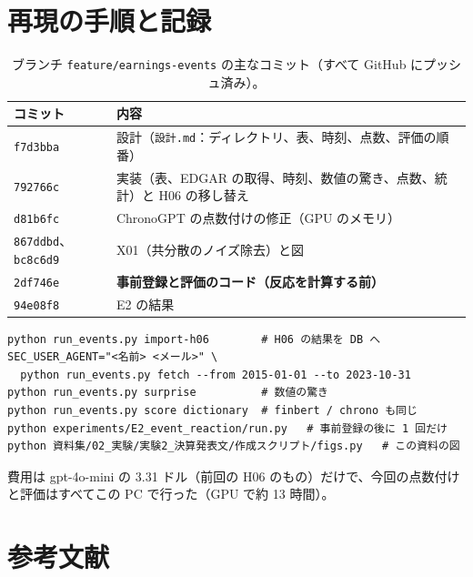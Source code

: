 \documentclass[xelatex,ja=standard,jafont=haranoaji,a4paper,10pt,openany]{bxjsreport}
\newcommand{\code}[1]{\texttt{#1}}
\begin{document}
\chapter{再現の手順と記録}\label{app:repro}

\begin{table}[H]
\centering
\caption{ブランチ \code{feature/earnings-events} の主なコミット（すべて GitHub にプッシュ済み）。}
\small
\begin{tabular}{ll}
\toprule
コミット & 内容 \\
\midrule
\code{f7d3bba} & 設計（\code{設計.md}：ディレクトリ、表、時刻、点数、評価の順番） \\
\code{792766c} & 実装（表、EDGAR の取得、時刻、数値の驚き、点数、統計）と H06 の移し替え \\
\code{d81b6fc} & ChronoGPT の点数付けの修正（GPU のメモリ） \\
\code{867ddbd}、\code{bc8c6d9} & X01（共分散のノイズ除去）と図 \\
\code{2df746e} & \textbf{事前登録と評価のコード（反応を計算する前）} \\
\code{94e08f8} & E2 の結果 \\
\bottomrule
\end{tabular}
\end{table}

\begin{verbatim}
python run_events.py import-h06        # H06 の結果を DB へ
SEC_USER_AGENT="<名前> <メール>" \
  python run_events.py fetch --from 2015-01-01 --to 2023-10-31
python run_events.py surprise          # 数値の驚き
python run_events.py score dictionary  # finbert / chrono も同じ
python experiments/E2_event_reaction/run.py   # 事前登録の後に 1 回だけ
python 資料集/02_実験/実験2_決算発表文/作成スクリプト/figs.py   # この資料の図
\end{verbatim}

費用は gpt-4o-mini の 3.31 ドル（前回の H06 のもの）だけで、今回の点数付けと評価はすべてこの PC で行った（GPU で約 13 時間）。

\chapter*{参考文献}
\end{document}
